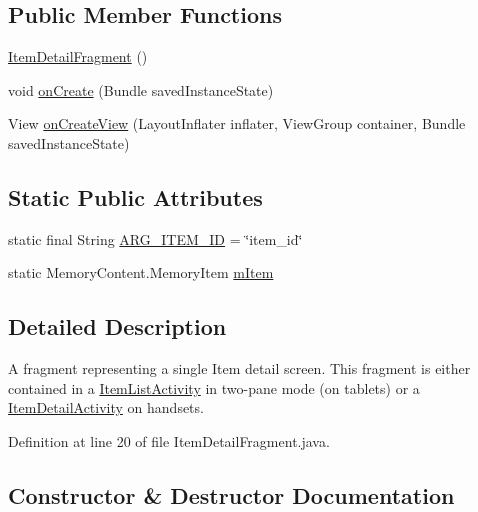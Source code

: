 \subsection*{Public Member Functions}
\begin{DoxyCompactItemize}
\item 
\hyperlink{classcom_1_1example_1_1memorism_1_1_item_detail_fragment_abe2ebd5db13c9ea5fae5fc6aef4fd1f0}{Item\+Detail\+Fragment} ()
\item 
void \hyperlink{classcom_1_1example_1_1memorism_1_1_item_detail_fragment_ad7e424057935edb269914905533dc75b}{on\+Create} (Bundle saved\+Instance\+State)
\item 
View \hyperlink{classcom_1_1example_1_1memorism_1_1_item_detail_fragment_a7344c27a8c7f8fdafd6d91bb0a6d1b2b}{on\+Create\+View} (Layout\+Inflater inflater, View\+Group container, Bundle saved\+Instance\+State)
\end{DoxyCompactItemize}
\subsection*{Static Public Attributes}
\begin{DoxyCompactItemize}
\item 
static final String \hyperlink{classcom_1_1example_1_1memorism_1_1_item_detail_fragment_a580108a1952bf48a351a80530dd5223c}{A\+R\+G\+\_\+\+I\+T\+E\+M\+\_\+\+ID} = \char`\"{}item\+\_\+id\char`\"{}
\item 
static Memory\+Content.\+Memory\+Item \hyperlink{classcom_1_1example_1_1memorism_1_1_item_detail_fragment_ac763290f824e91141020dc2a61e424b4}{m\+Item}
\end{DoxyCompactItemize}


\subsection{Detailed Description}
A fragment representing a single Item detail screen. This fragment is either contained in a \hyperlink{classcom_1_1example_1_1memorism_1_1_item_list_activity}{Item\+List\+Activity} in two-\/pane mode (on tablets) or a \hyperlink{classcom_1_1example_1_1memorism_1_1_item_detail_activity}{Item\+Detail\+Activity} on handsets. 

Definition at line 20 of file Item\+Detail\+Fragment.\+java.



\subsection{Constructor \& Destructor Documentation}
